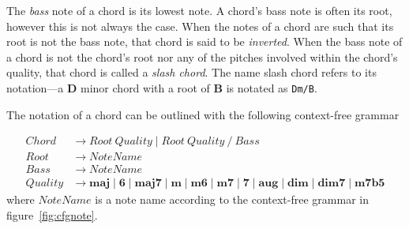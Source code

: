 The \textit{bass} note of a chord is its lowest note. A chord's bass note is often its root, however this is not always the case. When the notes of a chord are such that its root is not the bass note, that chord is said to be \textit{inverted}. When the bass note of a chord is not the chord's root nor any of the pitches involved within the chord's quality, that chord is called a \textit{slash chord}. The name slash chord refers to its notation---a \textbf{D} minor chord with a root of \textbf{B} is notated as \texttt{Dm/B}.

The notation of a chord can be outlined with the following context-free grammar

\begin{alignat*}
Chord &\to Root\ Quality \mid Root\ Quality\ \texttt{/} \ Bass \\
Root &\to NoteName \\
Bass &\to NoteName \\
Quality &\to \textbf{maj} \mid \textbf{6} \mid \textbf{maj7} \mid \textbf{m} \mid \textbf{m6} \mid \textbf{m7} \mid \textbf{7} \mid \textbf{aug} \mid \textbf{dim} \mid \textbf{dim7} \mid \textbf{m7b5}
\end{alignat*}
where $NoteName$ is a note name according to the context-free grammar in figure~\ref{fig:cfgnote}.